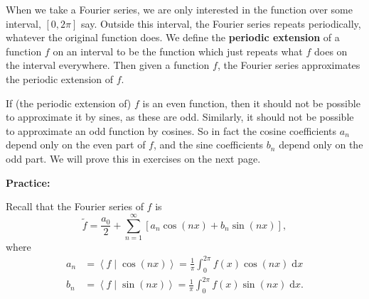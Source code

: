 \documentclass{article}
\newcommand{\diff}{\;\mathrm{d}}
\newcommand{\braket}[2]{\left\langle #1 \mid #2 \right\rangle}
\begin{document}
When we take a Fourier series, we are only interested in the function over some interval, $[0,2\pi]$ say. Outside this interval, the Fourier series repeats periodically, whatever the original function does. We define the \textbf{periodic extension} of a function $f$ on an interval to be the function which just repeats what $f$ does on the interval everywhere. Then given a function $f$, the Fourier series approximates the periodic extension of $f$.

If (the periodic extension of) $f$ is an even function, then it should not be possible to approximate it by sines, as these are odd. Similarly, it should not be possible to approximate an odd function by cosines. So in fact the cosine coefficients $a_n$ depend only on the even part of $f$, and the sine coefficients $b_n$ depend only on the odd part. We will prove this in exercises on the next page.


\clearpage










\textbf{Practice:}\bigskip

Recall that the Fourier series of $f$ is
\[\tilde{f}=\frac{a_0}{2}+\sum_{n=1}^\infty \left[a_n\cos(nx) + b_n\sin(nx)\right],\]
where
\begin{align*}
	a_n&=\braket{f}{\cos(nx)}=\frac{1}{\pi}\int_0^{2\pi} f(x)\cos(nx)\diff x\\
	b_n &= \braket{f}{\sin(nx)}=\frac{1}{\pi}\int_0^{2\pi} f(x)\sin(nx)\diff x.
\end{align*}
\end{document}
